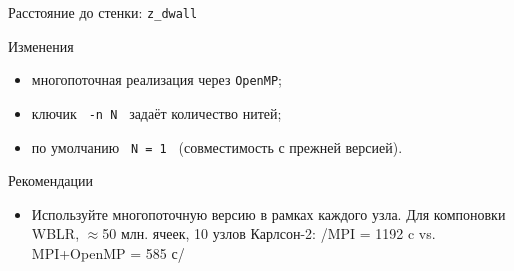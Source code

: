 \documentclass[xcolor={svgnames,table,hyperref},9pt]{beamer}
\newcommand*{\code}[1]{\texttt{\small #1}}
\begin{document}
\begin{frame}[fragile]{Расстояние до стенки: \texttt{z\_dwall}}

  \begin{block}{Изменения}\begin{itemize}
    \item многопоточная реализация через \alert{\code{OpenMP}};
    \item ключик \code{ -n N } задаёт количество нитей;
    \item \alert{по умолчанию} \code{ N = 1 } (совместимость с прежней версией).
  \end{itemize}\end{block}
  
  \begin{block}{Рекомендации}\begin{itemize}
    \item Используйте \alert{многопоточную} версию \alert{в рамках} каждого \alert{узла}. Для компоновки WBLR, $\approx$50 млн. ячеек, 10 узлов Карлсон-2:
    \txt/MPI = 1192 c vs. MPI+OpenMP = 585 с/
  \end{itemize}\end{block}
\end{frame}
\end{document}
